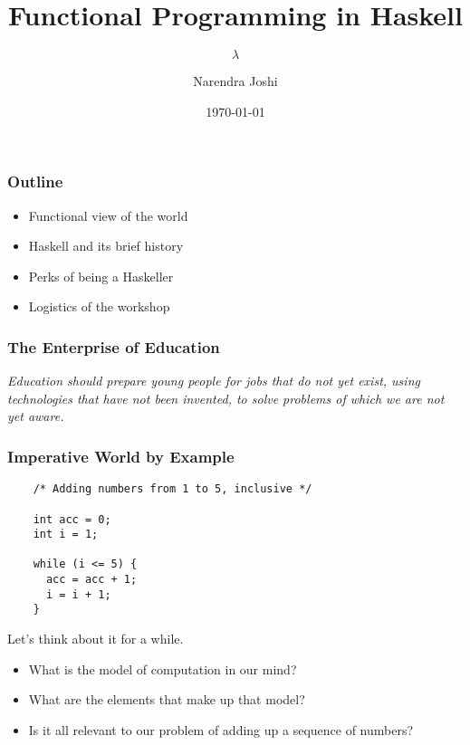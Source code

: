 \documentclass{beamer}
\title{Functional Programming in Haskell}
\subtitle{$\lambda$}
\author{Narendra Joshi}
\date{\today}
\begin{document}
\begin{frame}
  \titlepage
\end{frame}

\begin{frame}[t]
  \frametitle{Outline}

  \begin{itemize}
  \item{Functional view of the world}
  \item{Haskell and its brief history}
  \item{Perks of being a Haskeller}
  \item{Logistics of the workshop}
  \end{itemize}

\end{frame}

\begin{frame}[t]
  \frametitle{The Enterprise of Education}
  \begin{block}{}
    \emph{ Education should prepare young people for jobs that do not
      yet exist, using technologies that have not been invented,
      to solve problems of which we are not yet aware.}
  \end{block}
\end{frame}

\begin{frame}[fragile,t]
  \frametitle{Imperative World by Example}
  
  \begin{verbatim}
    /* Adding numbers from 1 to 5, inclusive */
    
    int acc = 0;
    int i = 1;

    while (i <= 5) {
      acc = acc + 1;
      i = i + 1;
    }
  \end{verbatim}

  Let's think about it for a while.

  \begin{itemize}
  \item What is the model of computation in our mind?
  \item What are the elements that make up that model?
  \item Is it all relevant to our problem of adding up a sequence of numbers?
  \end{itemize}
  
\end{frame}
\end{document}
